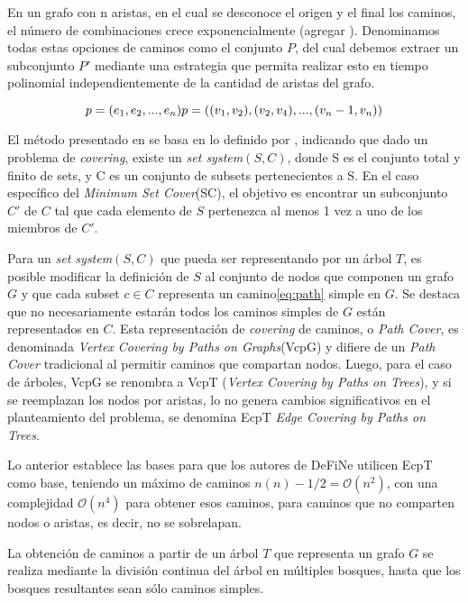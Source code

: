 En un grafo con n aristas, en el cual se desconoce el origen y el final los caminos, el n\'umero de combinaciones crece exponencialmente (agregar \cite{101 y 102 de define}). Denominamos todas estas opciones de caminos como el conjunto $P$, del cual debemos extraer un subconjunto $P'$ mediante una estrategia que permita realizar esto en tiempo polinomial independientemente de la cantidad de aristas del grafo.

\begin{equation}
p = (e_1, e_2,..., e_n)\\
p = ((v_1,v_2), (v_2,v_4),..., (v_n-1,v_n))
\label{eq:path}
\end{equation}

El m\'etodo presentado en \cite{breuer2015define} se basa en lo definido por \cite{lin2006vertex}, indicando que dado un problema de {\it covering}, existe un {\it set system}$(S,C)$, donde S es el conjunto total y finito de sets, y C es un conjunto de subsets pertenecientes a S. En el caso espec\'ifico del {\it Minimum Set Cover}(SC), el objetivo es encontrar un subconjunto $C'$ de $C$ tal que cada elemento de $S$ pertenezca al menos 1 vez a uno de los miembros de $C'$.

Para un {\it set system}$(S,C)$ que pueda ser representando por un \'arbol $T$, es posible modificar la definici\'on de $S$ al conjunto de nodos que componen un grafo $G$ y que cada subset $c \in C$ representa un camino\ref{eq:path} simple en $G$. Se destaca que no necesariamente estar\'an todos los caminos simples de $G$ est\'an representados en $C$. Esta representaci\'on de {\it covering} de caminos, o {\it Path Cover}, es denominada {\it Vertex Covering by Paths on Graphs}(VcpG) y difiere de un {\it Path Cover} tradicional al permitir caminos que compartan nodos. Luego, para el caso de \'arboles, VcpG se renombra a VcpT ({\it Vertex Covering by Paths on Trees}), y si se reemplazan los nodos por aristas, lo no genera cambios significativos en el planteamiento del problema, se denomina EcpT {\it Edge Covering by Paths on Trees}. %


Lo anterior establece las bases para que los autores de DeFiNe\cite{breuer2015define} utilicen EcpT como base, teniendo un m\'aximo de caminos $n(n)-1/2 = \mathcal{O}(n^{2})$, con una complejidad $\mathcal{O}(n^{4})$ para obtener esos caminos, para caminos que no comparten nodos o aristas, es decir, no se sobrelapan.

La obtenci\'on de caminos a partir de un \'arbol $T$ que representa un grafo $G$ se realiza mediante la divisi\'on continua del \'arbol en m\'ultiples bosques, hasta que los bosques resultantes sean s\'olo caminos simples.


